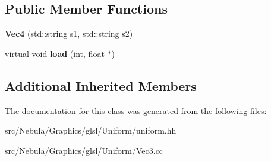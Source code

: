\subsection*{Public Member Functions}
\begin{DoxyCompactItemize}
\item 
\hypertarget{classNeb_1_1glsl_1_1Uniform_1_1Vector_1_1Vec4_a507acc5ac257f999383cfa4a8622a34c}{{\bfseries Vec4} (std\-::string s1, std\-::string s2)}\label{classNeb_1_1glsl_1_1Uniform_1_1Vector_1_1Vec4_a507acc5ac257f999383cfa4a8622a34c}

\item 
\hypertarget{classNeb_1_1glsl_1_1Uniform_1_1Vector_1_1Vec4_a57629c898603f94ff642248f0e2ebc71}{virtual void {\bfseries load} (int, float $\ast$)}\label{classNeb_1_1glsl_1_1Uniform_1_1Vector_1_1Vec4_a57629c898603f94ff642248f0e2ebc71}

\end{DoxyCompactItemize}
\subsection*{Additional Inherited Members}


The documentation for this class was generated from the following files\-:\begin{DoxyCompactItemize}
\item 
src/\-Nebula/\-Graphics/glsl/\-Uniform/uniform.\-hh\item 
src/\-Nebula/\-Graphics/glsl/\-Uniform/Vec3.\-cc\end{DoxyCompactItemize}
